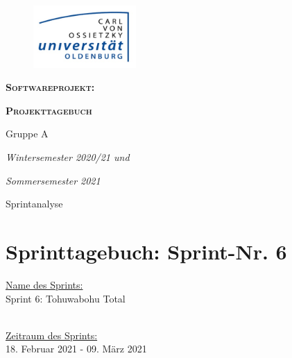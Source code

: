 \documentclass[12pt,a4paper, oneside]{article}
\author{Uni Oldenburg, SWP2020 Gruppe A}
\begin{document}
\begin{titlepage}									
\pagestyle{empty}									
\begin{center}

\begin{figure}[h]									
\centering											
\includegraphics[width=0.35\textwidth]{../img/Logo.jpg}
\end{figure}		

\bigskip \bigskip \noindent							
\textsc{\textbf{\LARGE Softwareprojekt:}} \par \bigskip \noindent																			
\textsc{\textbf{\LARGE Projekttagebuch}} 			    
													
													
\par \bigskip \bigskip \bigskip \bigskip \bigskip \noindent
{\Large Gruppe A} \par \medskip \noindent
		
\par \bigskip \bigskip \bigskip \bigskip \bigskip \bigskip \noindent																		
\textit{\Large Wintersemester 2020/21 und} \par \noindent
\textit{\Large Sommersemester 2021}				
													
\par \bigskip \bigskip \bigskip \bigskip \bigskip \bigskip \noindent			
\par \bigskip \bigskip \bigskip \noindent
{\Large Sprintanalyse} \par \medskip \noindent
		
\end{center}
\end{titlepage}

\tableofcontents
\pagebreak

\section{Sprinttagebuch: Sprint-Nr. 6}
\underline{Name des Sprints:}
\\
Sprint 6: Tohuwabohu Total

\noindent
\\
\underline{Zeitraum des Sprints:} 
\\
18. Februar 2021 - 09. März 2021
\end{document}

